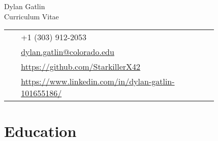 \documentclass[11pt]{article} %
\begin{document}
\begin{paracol}{2} %


\parbox[top][0.12\textheight][c]{\linewidth}{ %
    \vspace{-0.04\textheight} %
    \centering %
    {\sffamily\Huge Dylan Gatlin}\\\medskip %
    {\Huge\color{headings}\cvtextfont Curriculum Vitae}
}
\switchcolumn

\parbox[top][0.12\textheight][c]{\linewidth}{
    \vspace{-0.04\textheight}
    \colorbox{shade}{
        \begin{supertabular}{p{0.05\linewidth}|p{0.775\linewidth}}
            \raisebox{-1pt}{\faPhone} & +1 (303) 912-2053 \\
            \raisebox{0pt}{\small\faEnvelope} &
             \href{mailto:dylan.gatlin@colorado.edu}
             {dylan.gatlin@colorado.edu} \\
            \raisebox{-1pt}{\faGithub} &
             \href{https://github.com/StarkillerX42}
             {https://github.com/StarkillerX42} \\
            \raisebox{-1pt}{\faLinkedinSquare} &
             \href{https://www.linkedin.com/in/dylan-gatlin-101655186/}
             {https://www.linkedin.com/in/dylan-gatlin-101655186/} \\
        \end{supertabular}
    }
}
\end{paracol}


\pagebreak[3]
\section{Education} 
\end{document}
